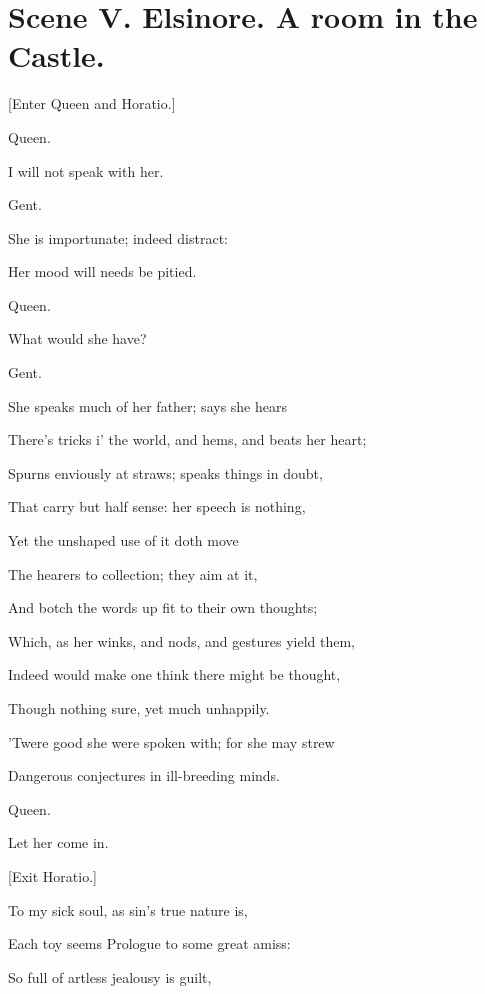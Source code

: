 \documentclass[12pt]{book}
\begin{document}
\section*{Scene V. Elsinore. A room in the Castle.}



[Enter Queen and Horatio.]



Queen.

I will not speak with her.



Gent.

She is importunate; indeed distract:

Her mood will needs be pitied.



Queen.

What would she have?



Gent.

She speaks much of her father; says she hears

There's tricks i' the world, and hems, and beats her heart;

Spurns enviously at straws; speaks things in doubt,

That carry but half sense: her speech is nothing,

Yet the unshaped use of it doth move

The hearers to collection; they aim at it,

And botch the words up fit to their own thoughts;

Which, as her winks, and nods, and gestures yield them,

Indeed would make one think there might be thought,

Though nothing sure, yet much unhappily.

'Twere good she were spoken with; for she may strew

Dangerous conjectures in ill-breeding minds.



Queen.

Let her come in.



[Exit Horatio.]



To my sick soul, as sin's true nature is,

Each toy seems Prologue to some great amiss:

So full of artless jealousy is guilt,
\end{document}
